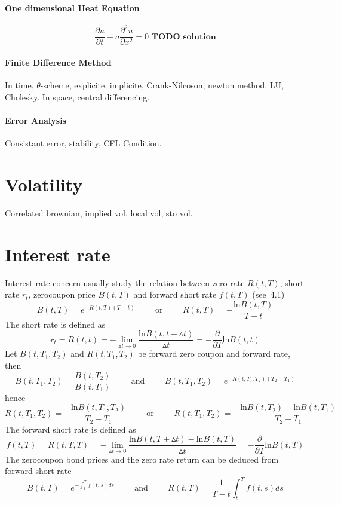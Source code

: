\documentclass[a4paper,10pt]{article}
\begin{document}
\paragraph{One dimensional Heat Equation}
\[
\frac{\partial u}{\partial t} + a \frac{\partial^2 u}{\partial x^2} = 0 \textbf{ TODO solution}
\]
\paragraph{Finite Difference Method}
In time, $\theta$-scheme, explicite, implicite, Crank-Nilcoson, newton method, LU, Cholesky. In space, central differencing.
\paragraph{Error Analysis}
Consistant error, stability, CFL Condition.



\section{Volatility}
Correlated brownian, implied vol, local vol, sto vol.
\section{Interest rate}
Interest rate concern usually study the relation between zero rate $R(t,T)$, short rate $r_t$, zerocoupon price $B(t,T)$ and forward short rate $f(t,T)$ (see~\cite{RUDI}4.1)
\[
B(t,T)=e^{-R(t,T)(T-t)}
\hspace{1cm} \text{or} \hspace{1cm}
R(t,T) = -\frac{\text{ln}B(t,T)}{T-t}
\]
The short rate is defined as
\[
r_t = R(t,t) = -\lim_{\vartriangle t \rightarrow 0} \frac{\text{ln}B(t,t+\vartriangle t)}{\vartriangle t} = -\frac{\partial}{\partial T}\text{ln}B(t,t) 
\]
Let $B(t,T_1,T_2)$ and $R(t,T_1,T_2)$ be forward zero coupon and forward rate, then
\[
B(t,T_1,T_2) = \frac{B(t,T_2)}{B(t,T_1)}
\hspace{1cm} \text{and} \hspace{1cm}
B(t,T_1,T_2) = e^{-R(t,T_1,T_2)(T_2-T_1)}
\]
hence
\[
R(t,T_1,T_2) = - \frac{\text{ln}B(t,T_1,T_2)}{T_2-T_1}
\hspace{1cm} \text{or} \hspace{1cm}
R(t,T_1,T_2) = - \frac{\text{ln}B(t,T_2)-\text{ln}B(t,T_1)}{T_2-T_1}
\]
The forward short rate is defined as
\[
f(t,T)=R(t,T,T) = - \lim_{\vartriangle t \rightarrow 0}  \frac{\text{ln}B(t,T+\vartriangle t)-\text{ln}B(t,T)}{\vartriangle t}
=  -\frac{\partial}{\partial T}\text{ln}B(t,T) 
\]
The zerocoupon bond prices and the zero rate return can be deduced from forward short rate
\[
B(t,T) = e^{-\int_t^Tf(t,s)ds}
\hspace{1cm} \text{and} \hspace{1cm}
R(t,T) = \frac{1}{T-t}\int_t^T f(t,s)ds
\]
\end{document}
